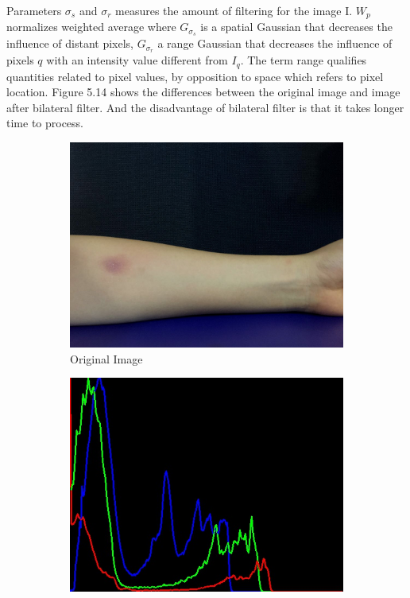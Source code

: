 Parameters $\sigma _{s}$ and $\sigma _{r}$ measures the amount of filtering for the image I. $W_{p}$ normalizes weighted average where $G_{\sigma _{s}}$ is a spatial Gaussian that decreases the influence of
distant pixels, $G_{\sigma _{r}}$ a range Gaussian that decreases the influence of pixels $q$ with an intensity
value different from $I_{q}$. The term range qualifies quantities related to pixel values, by opposition to space which refers to pixel location. Figure 5.14 shows the differences between the original image and image after bilateral filter. And the disadvantage of bilateral filter is that it takes longer time to process.
\begin{figure}[!h]
\centering
\begin{subfigure}{.5\textwidth}
  \centering
  \includegraphics[scale=0.23]{img/original}
  \caption{Original Image}
  \label{fig:sub1}
\end{subfigure}%
\begin{subfigure}{.5\textwidth}
  \centering
  \includegraphics[scale=0.43]{img/image}

\end{subfigure}
\end{figure}
